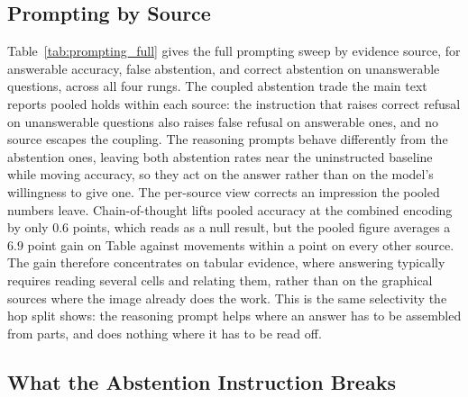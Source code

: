 \subsection{Prompting by Source}
\label{app:prompting_source}

Table~\ref{tab:prompting_full} gives the full prompting sweep by evidence source, for answerable accuracy, false abstention, and correct abstention on unanswerable questions, across all four rungs. The coupled abstention trade the main text reports pooled holds within each source: the instruction that raises correct refusal on unanswerable questions also raises false refusal on answerable ones, and no source escapes the coupling. The reasoning prompts behave differently from the abstention ones, leaving both abstention rates near the uninstructed baseline while moving accuracy, so they act on the answer rather than on the model's willingness to give one. The per-source view corrects an impression the pooled numbers leave. Chain-of-thought lifts pooled accuracy at the combined encoding by only $0.6$ points, which reads as a null result, but the pooled figure averages a $6.9$ point gain on Table against movements within a point on every other source. The gain therefore concentrates on tabular evidence, where answering typically requires reading several cells and relating them, rather than on the graphical sources where the image already does the work. This is the same selectivity the hop split shows: the reasoning prompt helps where an answer has to be assembled from parts, and does nothing where it has to be read off.

\subsection{What the Abstention Instruction Breaks}
\label{app:prompting_flips}

